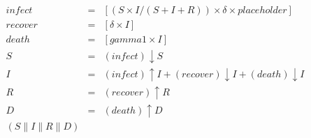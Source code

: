 \begin{eqnarray*}
\mathit{infect} & = & [(S\times I/(S+I+R))\times \delta\times \mathit{placeholder}]\\%
\mathit{recover} & = & [\delta\times I]\\%
\mathit{death} & = & [\mathit{gamma1}\times I]\\%
%
S & = & (\mathit{infect}){\downarrow}S\\%
I & = & (\mathit{infect}){\uparrow}I + (\mathit{recover}){\downarrow}I + (\mathit{death}){\downarrow}I\\%
R & = & (\mathit{recover}){\uparrow}R\\%
D & = & (\mathit{death}){\uparrow}D\\%
%
(S {\parallel} I {\parallel} R {\parallel} D)\end{eqnarray*}
